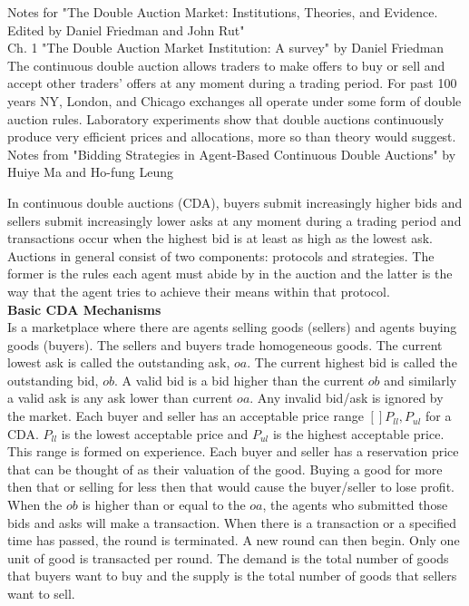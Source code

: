 \documentclass[12pt,twoside]{reedthesis}
\begin{document}
Notes for "The Double Auction Market: Institutions, Theories, and Evidence. Edited by Daniel Friedman and John Rut"\\

Ch. 1 "The Double Auction Market Institution: A survey" by Daniel Friedman \\

The continuous double auction allows traders to make offers to buy or sell and accept other traders' offers at any moment during a trading period. For past 100 years NY, London, and Chicago exchanges all operate under some form of double auction rules. Laboratory experiments show that double auctions continuously produce very efficient prices and allocations, more so than theory would suggest.\\

Notes from "Bidding Strategies in Agent-Based Continuous Double Auctions" by Huiye Ma and Ho-fung Leung

In continuous double auctions (CDA), buyers submit increasingly higher bids and sellers submit increasingly lower asks at any moment during a trading period and transactions occur when the highest bid is at least as high as the lowest ask. Auctions in general consist of two components: protocols and strategies. The former is the rules each agent must abide by in the auction and the latter is the way that the agent tries to achieve their means within that protocol.\\

\textbf{Basic CDA Mechanisms}\\
Is a marketplace where there are agents selling goods (sellers) and agents buying goods (buyers). The sellers and buyers trade homogeneous goods. The current lowest ask is called the outstanding ask, $oa$. The current highest bid is called the outstanding bid, $ob$. A valid bid is a bid higher than the current $ob$ and similarly a valid ask is any ask lower than current $oa$. Any invalid bid/ask is ignored by the market. Each buyer and seller has an acceptable price range $[]P_{ll}, P_{ul}$ for a CDA. $P_{ll}$ is the lowest acceptable price and $P_{ul}$ is the highest acceptable price. This range is formed on experience. Each buyer and seller has a reservation price that can be thought of as their valuation of the good. Buying a good for more then that or selling for less then that would cause the buyer/seller to lose profit. When the $ob$ is higher than or equal to the $oa$, the agents who submitted those bids and asks will make a transaction. When there is a transaction or a specified time has passed, the round is terminated. A new round can then begin. Only one unit of good is transacted per round. The demand is the total number of goods that buyers want to buy and the supply is the total number of goods that sellers want to sell.
\end{document}
